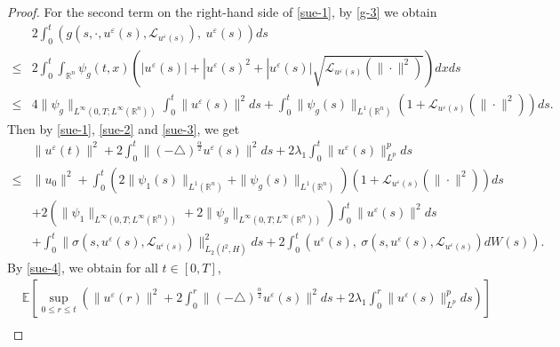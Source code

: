 \documentclass[11pt]{article}
\numberwithin{equation}{section}
\theoremstyle{plain}
\def\leq{\leqslant}
\begin{document}
\begin{proof}
 For the second term on the right-hand side of \eqref{sue-1}, by \eqref{g-3}
  we obtain
\begin{align} \label{sue-3}
        & 2 \int_0^t \left( g(s, \cdot, u^\varepsilon(s), \mathcal{L}_{u^\varepsilon(s)} ),\ u^\varepsilon(s) \right) ds  \nonumber \\
         \leq &
         2\int_0^t
         \int_{\mathbb{R}^n}
         \psi_g (t,x)
         \left (
         |u^\varepsilon(s)|
         + |u^\varepsilon(s)^2
         +
         |u^\varepsilon(s)|
         \sqrt{\mathcal{L}_{u^\varepsilon(s)}
         (\|\cdot\|^2)
        }
         \right ) dx ds
         \nonumber \\
         \leq &
         4 \|\psi_g\|_{L^\infty(0,T; L^\infty(\mathbb{R}^n) )}
         \int_0^t
         \|  u^\varepsilon(s) \|^2 ds
         +
         \int_0^t
         \| \psi_g (s) \|_{L^1(\mathbb{R}^n)}
         (1+  \mathcal{L}_{u^\varepsilon(s)}
         (\| \cdot\|^2)
         )ds.
 \end{align}
 Then by \eqref{sue-1},
 \eqref{sue-2} and
 \eqref{sue-3}, we get
 \begin{align}\label{sue-4}
     & \| u^\varepsilon(t) \|^2
       + 2 \int_0^t \| (-\triangle)^{\frac{\alpha}{2}} u^\varepsilon(s) \|^2 ds
       +2 \lambda_1 \int_0^t \| u^\varepsilon (s) \|^p_{L^p} ds  \nonumber \\
\leq & \| u_0 \|^2
       +  \int_0^t
       ( 2\| \psi_1(s) \|_{L^1(\mathbb{R}^n)}
       +\| \psi_g(s) \|_{L^1(\mathbb{R}^n)}
       )
        \left( 1 + \mathcal{L}_{u^\varepsilon(s)}(\|\cdot\|^2) \right) ds  \nonumber \\
     &
       +  2 \left(
       \|\psi_1\|_{L^\infty(0,T; L^\infty(\mathbb{R}^n))}
        + 2 \|\psi_g\|_{L^\infty(0,T; L^\infty(\mathbb{R}^n))} \right) \int_0^t \| u^\varepsilon(s) \|^2 ds  \nonumber \\
     & + \int_0^t \| \sigma(s, u^\varepsilon(s), \mathcal{L}_{u^\varepsilon(s)} ) \|_{L_2(l^2,H)}^2 ds
       + 2 \int_0^t \left( u^\varepsilon(s),\ \sigma(s, u^\varepsilon(s), \mathcal{L}_{u^\varepsilon(s)} )dW(s) \right).
\end{align}
By \eqref{sue-4}, we obtain
for all $t\in [0,T]$,
\begin{align}\label{sue-5}
    & \mathbb{E} \left [ \sup_{0 \leq r\leq t}
    \left (\| u^\varepsilon(r) \|^2
    + 2 \int_0^r \| (-\triangle)^{\frac{\alpha}{2}} u^\varepsilon(s) \|^2 ds
    +2 \lambda_1 \int_0^r \| u^\varepsilon (s) \|^p_{L^p} ds
    \right )
    \right ] \nonumber \\

\end{align}
\end{proof}
\end{document}

